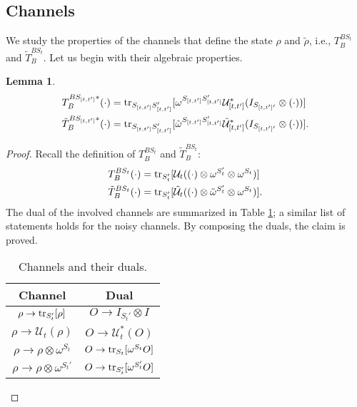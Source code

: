 \documentclass[prx,aps,amsmath,amssymb,floatfix,superscriptaddress,11pt,tightenlines,longbibliography,onecolumn,notitlepage]{revtex4-1}
\newcommand{\Tr}{\textnormal{tr}}
\newcommand{\tran}[1]{T_{B}^{BS_{#1}}}
\newcommand{\ttran}[1]{\tilde{T}_{B}^{BS_{#1}}}
\newcommand{\trantd}[2]{T_{B}^{BS_{[#1 , #2]}*}}
\newcommand{\ttrantd}[2]{\tilde{T}_{B}^{BS_{[#1 , #2]}*}}
\newcommand{\U}[2]{\mathcal{U}_{[#1, #2]}}
\newcommand{\tU}[2]{\tilde{\mathcal{U}}_{[#1, #2]}}
\newcommand{\Ohm}[2]{\omega^{S_{[#1, #2]} S_{[#1, #2]}'}}
\newcommand{\tOhm}[2]{\tilde{\omega}^{S_{[#1, #2]} S_{[#1, #2]}'}}
\newtheorem{lem}{Lemma}
\begin{document}
\subsection{Channels\label{section:processes}}
We study the properties of the channels that define the state $\rho$ and $\tilde{\rho}$, i.e., $T_B^{BS_t}$ and $\tilde{T}_B^{BS_t}$. Let us begin with their algebraic properties.
\begin{lem}
  \label{lemma:dual}
  \begin{equation}
    \begin{aligned}
      \trantd{t}{t'}(\cdot) &= \Tr_{S_{[t,t']} S_{[t,t']}'}[\Ohm{t}{t'} \U{t}{t'}^* (I_{S_{[t,t']'}} \otimes (\cdot))]\\  
      \ttrantd{t}{t'}(\cdot) &= \Tr_{S_{[t,t']} S_{[t,t']}'}[\tOhm{t}{t'} \tU{t}{t'}^* (I_{S_{[t,t']'}} \otimes (\cdot))]. 
    \end{aligned}
  \end{equation} 
\end{lem}
\begin{proof}
  Recall the definition of $\tran{t}$ and $\ttran{t}$:
  \begin{equation}
    \begin{aligned}
      \tran{t}(\cdot) &= \Tr_{S_t'}[\mathcal{U}_t((\cdot)\otimes \omega^{S_t'} \otimes \omega^{S_t})] \\
      \ttran{t}(\cdot) &= \Tr_{S_t'}[\tilde{\mathcal{U}}_t((\cdot)\otimes \tilde{\omega}^{S_t'} \otimes \omega^{S_t})].
    \end{aligned}
  \end{equation}
    The dual of the involved channels are summarized in Table \ref{table:channel_dual}; a similar list of statements holds for the noisy channels. By composing the duals, the claim is proved. 
    \begin{table}[ht]
      \centering
      \begin{tabular}{|c| c|}
        \hline
        Channel & Dual \\
        \hline
        $\rho \to \Tr_{S_t'}[\rho]$ & $O \to  I_{S_t'}\otimes I$ \\
        \hline
        $\rho \to \mathcal{U}_t(\rho)$ & $O\to \mathcal{U}_t^*(O)$ \\
        \hline
        $\rho \to \rho \otimes \omega^{S_t}$ & $O \to \Tr_{S_t}[\omega^{S_t}O]$ \\
        \hline
        $\rho \to \rho \otimes \omega^{S_t'}$ & $O \to \Tr_{S_t'}[\omega^{S_t'}O]$ \\
        \hline
      \end{tabular}
      \caption{Channels and their duals.\label{table:channel_dual}}
    \end{table}
\end{proof}
\end{document}
